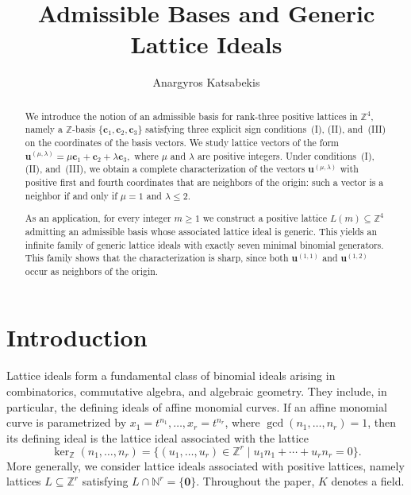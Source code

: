 \documentclass[12pt,a4paper]{amsart}
\title[]{Admissible Bases and Generic Lattice Ideals}
\author[]{Anargyros Katsabekis}
\theoremstyle{definition}
\begin{document}
\begin{abstract} We introduce the notion of an admissible basis for rank-three positive
lattices in $\mathbb Z^4$, namely a $\mathbb Z$-basis
$\{\mathbf c_1,\mathbf c_2,\mathbf c_3\}$ satisfying three explicit
sign conditions~\textup{(I)}, \textup{(II)}, and~\textup{(III)} on the
coordinates of the basis vectors. We study lattice vectors of the form
$
\mathbf u^{(\mu,\lambda)}
=
\mu\mathbf c_1+\mathbf c_2+\lambda\mathbf c_3,$
where $\mu$ and $\lambda$ are positive integers. Under
conditions~\textup{(I)}, \textup{(II)}, and~\textup{(III)}, we obtain a
complete characterization of the vectors
$\mathbf u^{(\mu,\lambda)}$ with positive first and fourth coordinates
that are neighbors of the origin: such a vector is a neighbor if and
only if $\mu=1$ and $\lambda\le2$.

As an application, for every integer $m\ge1$ we construct a positive
lattice $L(m)\subseteq\mathbb Z^4$ admitting an admissible basis whose
associated lattice ideal is generic. This yields an infinite family of
generic lattice ideals with exactly seven minimal binomial generators. This family shows that the characterization is sharp, since both
$\mathbf u^{(1,1)}$ and $\mathbf u^{(1,2)}$ occur as neighbors of the
origin.
\end{abstract}

\maketitle

\section{Introduction}

Lattice ideals form a fundamental class of binomial ideals arising in
combinatorics, commutative algebra, and algebraic geometry. They
include, in particular, the defining ideals of affine monomial curves.
If an affine monomial curve is parametrized by
$x_1=t^{n_1},\ldots,x_r=t^{n_r}$, where
$\gcd(n_1,\ldots,n_r)=1$, then its defining ideal is the lattice ideal
associated with the lattice
\[
\ker_{\mathbb Z}(n_1,\ldots,n_r)
=\{(u_1,\ldots,u_r)\in\mathbb Z^r \mid
u_1n_1+\cdots+u_rn_r=0\}.
\]
More generally, we consider lattice ideals
associated with positive lattices, namely lattices
$L\subseteq\mathbb Z^r$ satisfying
$
L\cap\mathbb N^r=\{\mathbf0\}.$ Throughout the paper, $K$ denotes a field.
\end{document}
